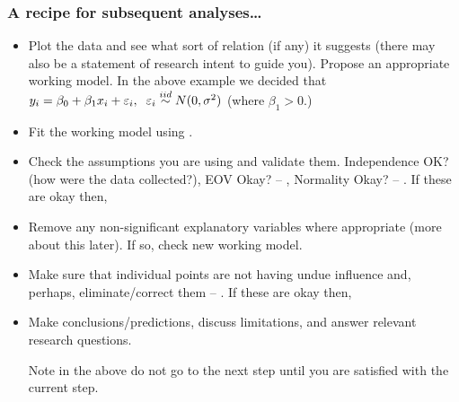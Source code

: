 \documentclass{beamer}\usepackage[]{graphicx}\usepackage[]{xcolor}
\begin{document}
\begin{frame}[fragile]
\frametitle{A recipe for subsequent analyses\ldots}

\begin{itemize}
\item Plot the data and see what sort of relation (if any) it suggests (there may also be a statement of research intent to guide you). 
Propose an appropriate working model. 
In the above example we decided that 
$y_i=\beta_0+\beta_1 x_i+\varepsilon_i, \;\;  \varepsilon_i\stackrel{iid}{\sim} N(0,\sigma^2)$ (where $\beta_1>0$.)

\item Fit the working model using .

\item Check the assumptions you are using and validate them. Independence OK? (how were the data collected?), EOV Okay? -- , Normality Okay? -- . 
If these are okay then,

\item Remove any non-significant explanatory variables where appropriate (more about this later). If so, check new working model.

\item Make sure that individual points are not having undue influence and, perhaps, eliminate/correct them -- . If these are okay then,

\item Make conclusions/predictions, discuss limitations, and answer relevant research questions.

\medskip
Note in the above do not  go to the next step until you are satisfied with the current step. 
\end {itemize}

\end{frame}







\end{document}
